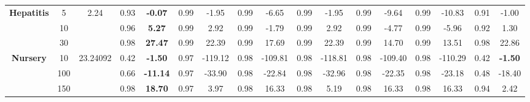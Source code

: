 \documentclass[letterpaper]{article}
\theoremstyle{definition}
\begin{document}
\begin{table}[t]
\begin{tabular}{|c|c|c|c|c|c|c|c|c|c|c|c|c|c|c|c|c|}
\multirow{3}{*}{\textbf{Hepatitis}} & 5        & 2.24     & 0.93  & \textbf{-0.07}   & 0.99      & -1.95        & 0.99   & -6.65             & 0.99      & -1.95        & 0.99  & -9.64            & 0.99     & -10.83             & 0.91    & -1.00           \\ \cline{2-17} 
                                    & 10       &          & 0.96  & \textbf{5.27}    & 0.99      & 2.92         & 0.99   & -1.79             & 0.99      & 2.92         & 0.99  & -4.77            & 0.99     & -5.96              & 0.92    & 1.30            \\ \cline{2-17} 
                                    & 30       &          & 0.98  & \textbf{27.47}   & 0.99      & 22.39        & 0.99   & 17.69             & 0.99      & 22.39        & 0.99  & 14.70            & 0.99     & 13.51              & 0.98    & 22.86           \\ \hline

\multirow{3}{*}{\textbf{Nursery}}   & 10       & 23.24092 & 0.42  & \textbf{-1.50}   & 0.97      & -119.12      & 0.98   & -109.81           & 0.98      & -118.81      & 0.98      & -109.40      & 0.98         & -110.29        & 0.42   & \textbf{-1.50}   \\ \cline{2-17} 
                                    & 100      &          & 0.66  & \textbf{-11.14}  & 0.97      & -33.90       & 0.98   & -22.84            & 0.98      & -32.96       & 0.98      & -22.35       & 0.98         & -23.18         & 0.48   & -18.40           \\ \cline{2-17} 
                                    & 150      &          & 0.98  & \textbf{18.70}   & 0.97      & 3.97         & 0.98   & 16.33             & 0.98      & 5.19         & 0.98      & 16.33        & 0.98         & 16.33          & 0.94   & 2.42             \\ \hline


\end{tabular}
\end{table}
\end{document}
